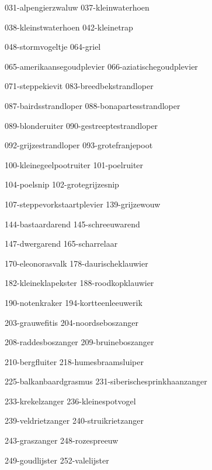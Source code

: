 \begin{figure*}[h!]
    \centering
    \subfig
    {031-alpengierzwaluw}
    {037-kleinwaterhoen}

    \subfig
    {038-kleinstwaterhoen}
    {042-kleinetrap}

    \subfig
    {048-stormvogeltje}
    {064-griel}

    \subfig
    {065-amerikaansegoudplevier}
    {066-aziatischegoudplevier}
    
    \subfig
    {071-steppekievit}
    {083-breedbekstrandloper}

    \subfig
    {087-bairdsstrandloper}
    {088-bonapartesstrandloper}
\end{figure*}


\begin{figure*}[h!]
    \centering
    \subfig
    {089-blonderuiter}
    {090-gestreeptestrandloper}
    

    \subfig
    {092-grijzestrandloper}
    {093-grotefranjepoot}

    \subfig
    {100-kleinegeelpootruiter}
    {101-poelruiter}

    \subfig
    {104-poelsnip}
    {102-grotegrijzesnip}

    \subfig
    {107-steppevorkstaartplevier}
    {139-grijzewouw}

    \subfig
    {144-bastaardarend}
    {145-schreeuwarend}
\end{figure*}

\begin{figure*}[h!]
    \centering
    \subfig
    {147-dwergarend}
    {165-scharrelaar}

    \subfig
    {170-eleonorasvalk}
    {178-daurischeklauwier}

    \subfig
    {182-kleineklapekster}
    {188-roodkopklauwier}

    \subfig
    {190-notenkraker}
    {194-kortteenleeuwerik}

    \subfig
    {203-grauwefitis}
    {204-noordseboszanger}
    
    \subfig
    {208-raddesboszanger}
    {209-bruineboszanger}
\end{figure*}

\begin{figure*}[h!]
    \centering
    \subfig
    {210-bergfluiter}
    {218-humesbraamsluiper}

    \subfig
    {225-balkanbaardgrasmus}
    {231-siberischesprinkhaanzanger}    
    
    \subfig
    {233-krekelzanger}
    {236-kleinespotvogel}

    \subfig
    {239-veldrietzanger}
    {240-struikrietzanger}
    
    \subfig
    {243-graszanger}
    {248-rozespreeuw}

    \subfig
    {249-goudlijster}
    {252-valelijster}
\end{figure*}

